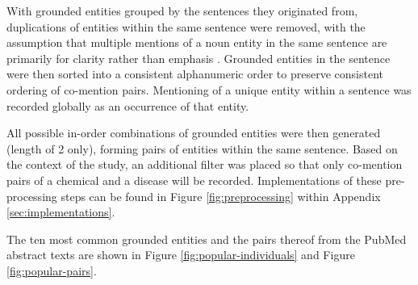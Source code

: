 \documentclass[10pt, oneside]{article}
\begin{document}
With grounded entities grouped by the sentences they originated from, duplications of entities within the same sentence were removed, with the assumption that multiple mentions of a noun entity in the same sentence are primarily for clarity rather than emphasis \cite{clark1979search}. Grounded entities in the sentence were then sorted into a consistent alphanumeric order to preserve consistent ordering of co-mention pairs. Mentioning of a unique entity within a sentence was recorded globally as an occurrence of that entity. 

All possible in-order combinations of grounded entities were then generated (length of 2 only), forming pairs of entities within the same sentence. Based on the context of the study, an additional filter was placed so that only co-mention pairs of a chemical and a disease will be recorded. Implementations of these pre-processing steps can be found in Figure \ref{fig:preprocessing} within Appendix \ref{sec:implementations}.

The ten most common grounded entities and the pairs thereof from the PubMed abstract texts are shown in Figure \ref{fig:popular-individuals} and Figure \ref{fig:popular-pairs}.
\end{document}
